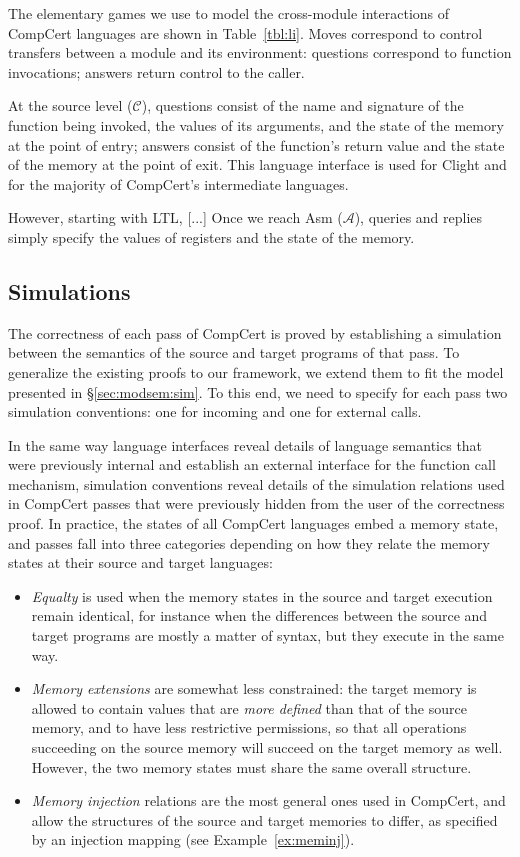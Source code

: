 \documentclass[acmsmall,timestamp,review,anonymous]{acmart}
\begin{document}
The elementary games we use to model
the cross-module interactions of CompCert languages
are shown in Table~\ref{tbl:li}.
Moves correspond to control transfers
between a module and its environment:
questions correspond to function invocations;
answers return control to the caller.

At the source level ($\mathcal{C}$),
questions consist of
the name and signature of the function being invoked,
the values of its arguments,
and the state of the memory at the point of entry;
answers
consist of the function's return value
and the state of the memory at the point of exit.
This language interface is used for Clight and
for the majority of CompCert's intermediate languages.

However, starting with LTL, [...]
Once we reach Asm ($\mathcal{A}$),
queries and replies simply specify
the values of registers and the state of the memory.


\subsection{Simulations} %

The correctness of each pass of CompCert
is proved by establishing a simulation between
the semantics of the source and target programs
of that pass.
To generalize the existing proofs to our framework,
we extend them to fit the model presented in \S\ref{sec:modsem:sim}.
To this end,
we need to specify for each pass
two simulation conventions:
one for incoming and one for external calls.

In the same way language interfaces
reveal details of language semantics
that were previously internal
and establish an external interface for
the function call mechanism,
simulation conventions reveal
details of the simulation relations
used in CompCert passes
that were previously hidden from
the user of the correctness proof.
In practice,
the states of all CompCert languages
embed a memory state,
and passes fall into three categories
depending on how they relate
the memory states at their source and target languages:
\begin{itemize}
\item \emph{Equalty} is used when the memory states
  in the source and target execution remain identical,
  for instance when the differences between
  the source and target programs are mostly a matter of syntax,
  but they execute in the same way.
\item \emph{Memory extensions} are somewhat less constrained:
  the target memory is allowed to contain values that are
  \emph{more defined} than that of the source memory,
  and to have less restrictive permissions,
  so that all operations succeeding on the source memory
  will succeed on the target memory as well.
  However,
  the two memory states must share the same overall structure.
\item \emph{Memory injection} relations
  are the most general ones used in CompCert,
  and allow the structures of the source and target memories
  to differ, as specified by an injection mapping
  (see Example~\ref{ex:meminj}).
\end{itemize}
\end{document}
